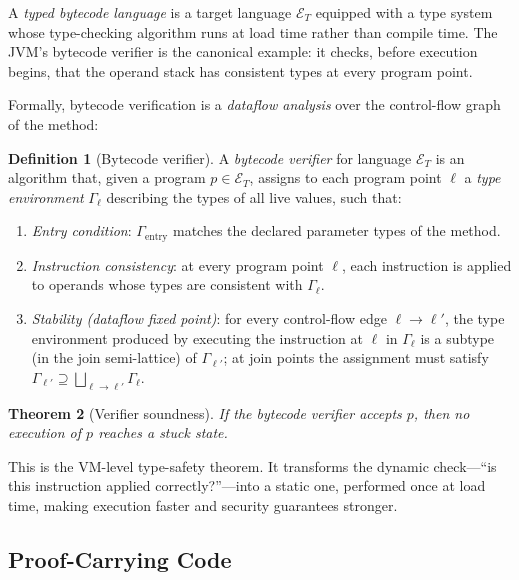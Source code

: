 \documentclass[11pt, a4paper]{article}
\theoremstyle{definition}
\newtheorem{definition}{Definition}[section]
\theoremstyle{plain}
\newtheorem{theorem}[definition]{Theorem}
\theoremstyle{remark}
\begin{document}
A \emph{typed bytecode language} is a target language $\mathcal{E}_T$
equipped with a type system whose type-checking algorithm runs at load time
rather than compile time. The JVM's bytecode verifier is the canonical
example: it checks, before execution begins, that the operand stack has
consistent types at every program point.

Formally, bytecode verification is a \emph{dataflow analysis} over the
control-flow graph of the method:

\begin{definition}[Bytecode verifier]
  A \emph{bytecode verifier} for language $\mathcal{E}_T$ is an algorithm
  that, given a program $p \in \mathcal{E}_T$, assigns to each program
  point $\ell$ a \emph{type environment} $\Gamma_\ell$ describing the types of
  all live values, such that:
  \begin{enumerate}
    \item \emph{Entry condition}: $\Gamma_{\mathrm{entry}}$ matches the declared
          parameter types of the method.
    \item \emph{Instruction consistency}: at every program point $\ell$,
          each instruction is applied to operands whose types are consistent
          with $\Gamma_\ell$.
    \item \emph{Stability (dataflow fixed point)}: for every control-flow edge
          $\ell \to \ell'$, the type environment produced by executing the
          instruction at $\ell$ in $\Gamma_\ell$ is a subtype (in the join
          semi-lattice) of $\Gamma_{\ell'}$; at join points the assignment
          must satisfy $\Gamma_{\ell'} \supseteq \bigsqcup_{\ell \to \ell'} \Gamma_\ell$.
  \end{enumerate}
\end{definition}

\begin{theorem}[Verifier soundness]
  If the bytecode verifier accepts $p$, then no execution of $p$ reaches
  a stuck state.
\end{theorem}

This is the VM-level type-safety theorem. It transforms the dynamic 
check---``is this instruction applied correctly?''---into a static one,
performed once at load time, making execution faster and security guarantees
stronger.

\subsection{Proof-Carrying Code}
\end{document}

